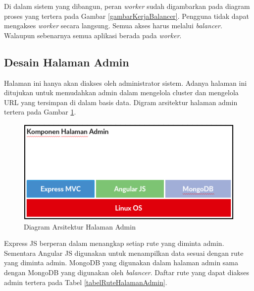 \documentclass{ta-its}
\begin{document}
				Di dalam sistem yang dibangun, peran \textit{worker} sudah digambarkan pada diagram proses yang tertera pada Gambar \ref{gambarKerjaBalancer}. Pengguna tidak dapat mengakses \textit{worker} secara langsung. Semua akses harus melalui \textit{balancer}. Walaupun sebenarnya semua aplikasi berada pada \textit{worker}.
			
			\subsection{Desain Halaman Admin}
				Halaman ini hanya akan diakses oleh administrator sistem. Adanya halaman ini ditujukan untuk memudahkan admin dalam mengelola cluster dan mengelola URL yang tersimpan di dalam basis data. Digram arsitektur halaman admin tertera pada Gambar \ref{gambarArsitekturWeb}.
				
				\begin{figure}[] %
					\centering
					\includegraphics[width=\linewidth]{contoh_img/kompweb}
					\caption{Diagram Arsitektur Halaman Admin}
					\label{gambarArsitekturWeb}
				\end{figure}
				
				Express JS berperan dalam menangkap setiap rute yang diminta admin. Sementara Angular JS digunakan untuk menampilkan data sesuai dengan rute yang diminta admin. MongoDB yang digunakan dalam halaman admin sama dengan MongoDB yang digunakan oleh \textit{balancer}. Daftar rute yang dapat diakses admin tertera pada Tabel \ref{tabelRuteHalamanAdmin}.
				
\end{document}
